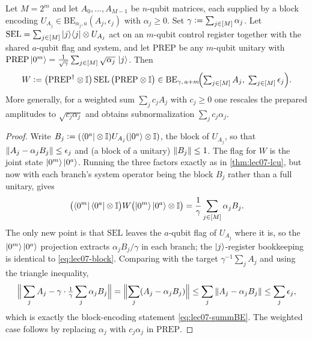 \begin{proposition}
\label{prop:lec07-sum}
Let $M=2^m$ and let $A_0,\dots,A_{M-1}$ be $n$-qubit matrices, each supplied by a
block encoding $U_{A_j}\in\mathrm{BE}_{\alpha_j,a}(A_j,\epsilon_j)$ with
$\alpha_j\ge0$. Set $\gamma\vcentcolon=\sum_{j\in[M]}\alpha_j$. Let
$\mathrm{SEL}=\sum_{j\in[M]}\ket{j}\!\bra{j}\otimes U_{A_j}$ act on an $m$-qubit control
register together with the shared $a$-qubit flag and system, and let $\mathrm{PREP}$
be any $m$-qubit unitary with
$\mathrm{PREP}\ket{0^m}=\frac{1}{\sqrt\gamma}\sum_{j\in[M]}\sqrt{\alpha_j}\,\ket{j}$.
Then
\begin{equation}
  W\vcentcolon=\bigl(\mathrm{PREP}^{\dagger}\otimes\mathbb{I}\bigr)\,\mathrm{SEL}\,
          \bigl(\mathrm{PREP}\otimes\mathbb{I}\bigr)
  \in\mathrm{BE}_{\gamma,\,a+m}\!\Bigl(\textstyle\sum_{j\in[M]}A_j,\;
     \sum_{j\in[M]}\epsilon_j\Bigr).
  \label{eq:lec07-summBE}
\end{equation}
More generally, for a weighted sum $\sum_j c_j A_j$ with $c_j\ge0$ one rescales the
prepared amplitudes to $\sqrt{c_j\alpha_j}$ and obtains subnormalization
$\sum_j c_j\alpha_j$.
\end{proposition}

\begin{proof}
Write $B_j\vcentcolon=(\bra{0^a}\otimes\mathbb{I})U_{A_j}(\ket{0^a}\otimes\mathbb{I})$, the block of
$U_{A_j}$, so that $\left\lVert A_j-\alpha_j B_j \right\rVert\le\epsilon_j$ and (a block of a unitary)
$\left\lVert B_j \right\rVert\le1$. The flag for $W$ is the joint state $\ket{0^m}\ket{0^a}$. Running
the three factors exactly as in \cref{thm:lec07-lcu}, but now with each branch's
system operator being the block $B_j$ rather than a full unitary, gives
\begin{equation}
  \bigl(\bra{0^m}\bra{0^a}\otimes\mathbb{I}\bigr)W
  \bigl(\ket{0^m}\ket{0^a}\otimes\mathbb{I}\bigr)
  =\frac{1}{\gamma}\sum_{j\in[M]}\alpha_j B_j.
  \label{eq:lec07-sumblock}
\end{equation}
The only new point is that $\mathrm{SEL}$ leaves the $a$-qubit flag of $U_{A_j}$
where it is, so the $\ket{0^m}\ket{0^a}$ projection extracts $\alpha_j B_j/\gamma$
in each branch; the $\ket{j}$-register bookkeeping is identical to
\eqref{eq:lec07-block}. Comparing with the target $\gamma^{-1}\sum_j A_j$ and using
the triangle inequality,
\begin{equation}
  \Bigl\lVert\,\sum_{j}A_j-\gamma\cdot\tfrac1\gamma\sum_j\alpha_j B_j\Bigr\rVert
  =\Bigl\lVert\sum_j(A_j-\alpha_j B_j)\Bigr\rVert
  \le\sum_j\left\lVert A_j-\alpha_j B_j \right\rVert\le\sum_j\epsilon_j,
  \label{eq:lec07-sumerr}
\end{equation}
which is exactly the block-encoding statement \eqref{eq:lec07-summBE}. The weighted
case follows by replacing $\alpha_j$ with $c_j\alpha_j$ in $\mathrm{PREP}$.
\end{proof}

